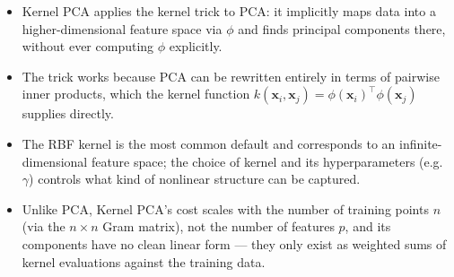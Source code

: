 \documentclass[11pt]{article}
\begin{document}
\begin{itemize}
  \item Kernel PCA applies the kernel trick to PCA: it implicitly maps
        data into a higher-dimensional feature space via $\phi$ and finds
        principal components there, without ever computing $\phi$
        explicitly.
  \item The trick works because PCA can be rewritten entirely in terms of
        pairwise inner products, which the kernel function $k(\mathbf{x}_i,
        \mathbf{x}_j) = \phi(\mathbf{x}_i)^\top \phi(\mathbf{x}_j)$ supplies
        directly.
  \item The RBF kernel is the most common default and corresponds to an
        infinite-dimensional feature space; the choice of kernel and its
        hyperparameters (e.g.\ $\gamma$) controls what kind of nonlinear
        structure can be captured.
  \item Unlike PCA, Kernel PCA's cost scales with the number of training
        points $n$ (via the $n \times n$ Gram matrix), not the number of
        features $p$, and its components have no clean linear form ---
        they only exist as weighted sums of kernel evaluations against the
        training data.
\end{itemize}
\end{document}
